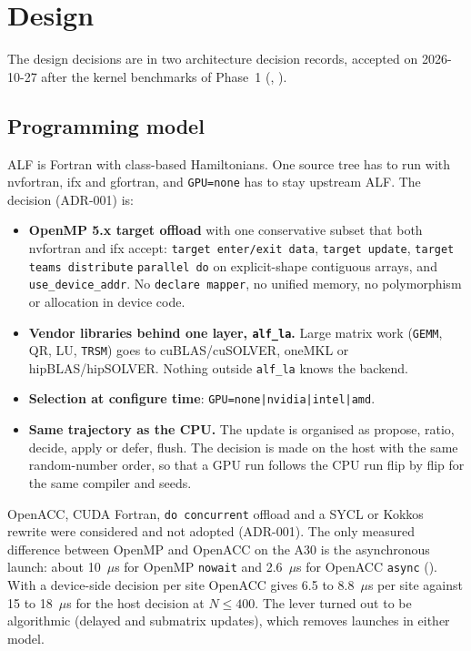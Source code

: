 \section{Design}
\label{sec:design}

The design decisions are in two architecture decision records, accepted on 2026-10-27 after the kernel benchmarks of Phase~1 (, ).

\subsection{Programming model}

ALF is Fortran with class-based Hamiltonians. One source tree has to run with nvfortran, ifx and gfortran, and \texttt{GPU=none} has to stay upstream ALF. The decision (ADR-001) is:

\begin{itemize}
\item \textbf{OpenMP 5.x target offload} with one conservative subset that both nvfortran and ifx accept: \texttt{target enter/exit data}, \texttt{target update}, \texttt{target teams distribute} \texttt{parallel do} on explicit-shape contiguous arrays, and \texttt{use\_device\_addr}. No \texttt{declare mapper}, no unified memory, no polymorphism or allocation in device code.
\item \textbf{Vendor libraries behind one layer, \texttt{alf\_la}.} Large matrix work (\texttt{GEMM}, QR, LU, \texttt{TRSM}) goes to cuBLAS/cuSOLVER, oneMKL or hipBLAS/hipSOLVER. Nothing outside \texttt{alf\_la} knows the backend.
\item \textbf{Selection at configure time}: \texttt{GPU=none|nvidia|intel|amd}.
\item \textbf{Same trajectory as the CPU.} The update is organised as propose, ratio, decide, apply or defer, flush. The decision is made on the host with the same random-number order, so that a GPU run follows the CPU run flip by flip for the same compiler and seeds.
\end{itemize}

OpenACC, CUDA Fortran, \texttt{do concurrent} offload and a SYCL or Kokkos rewrite were considered and not adopted (ADR-001). The only measured difference between OpenMP and OpenACC on the A30 is the asynchronous launch: about 10~$\mu$s for OpenMP \texttt{nowait} and 2.6~$\mu$s for OpenACC \texttt{async} (). With a device-side decision per site OpenACC gives 6.5 to 8.8~$\mu$s per site against 15 to 18~$\mu$s for the host decision at $N\le400$. The lever turned out to be algorithmic (delayed and submatrix updates), which removes launches in either model.

